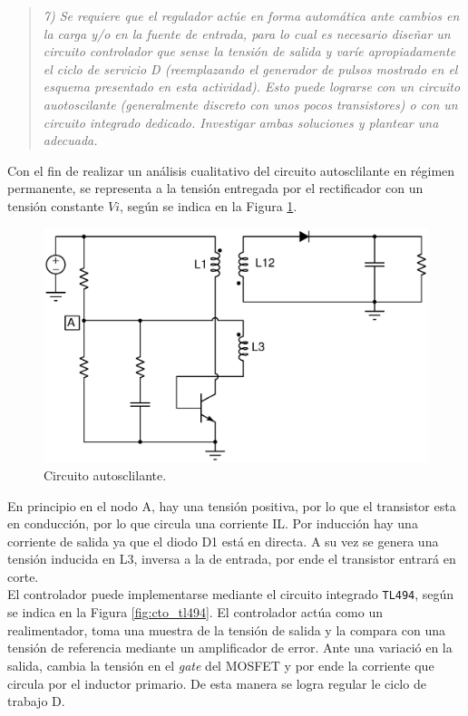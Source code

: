 \begin{quote} \textit{7) Se requiere que el regulador actúe en forma automática ante cambios en la carga y/o en la fuente de entrada, para lo cual es necesario diseñar un circuito controlador que sense la tensión de salida y varíe apropiadamente el ciclo de servicio D (reemplazando el generador de pulsos mostrado en el esquema presentado en esta actividad). Esto puede lograrse con un circuito auotoscilante (generalmente discreto con unos pocos transistores) o con un circuito integrado dedicado. Investigar ambas soluciones y plantear una adecuada.}
\end{quote}


Con el fin de realizar un análisis cualitativo del circuito autosclilante en régimen permanente, se representa a la tensión entregada por el rectificador con un tensión constante $Vi$, según se indica en la Figura \ref{fig:cto_auto}. 

\begin{figure}[H]
	\centering
	\includegraphics[scale=0.4]{Figuras/auto.eps}
	\caption{Circuito autosclilante.}
	\label{fig:cto_auto}
\end{figure}


En principio en el nodo A, hay una tensión positiva, por lo que el transistor esta en conducción, por lo que circula una corriente IL. Por inducción hay una corriente de salida ya que el diodo D1 está en directa. A su vez se genera una tensión inducida en L3, inversa a la de entrada, por ende el transistor entrará en corte. \\


El controlador puede implementarse mediante el circuito integrado \texttt{TL494}, según se indica en la Figura \ref{fig:cto_tl494}. El controlador actúa como un realimentador, toma una muestra de la tensión de salida y la compara con una tensión de referencia mediante un amplificador de error. Ante una variació en la salida, cambia la tensión en el \textit{gate} del MOSFET y por ende la corriente que circula por el inductor primario. De esta manera se logra regular le ciclo de trabajo D.


